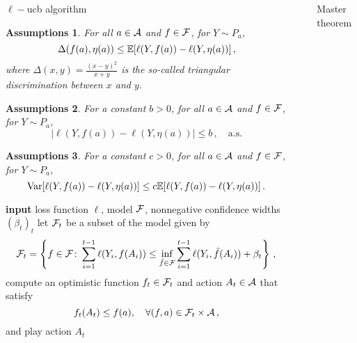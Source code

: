 \documentclass[final,notheorems,noamsthm,20pt]{beamer}
\newtheorem{assumption}{Assumptions}
\newlength{\sepwidth}
\newlength{\colwidth}
\newcommand{\separatorcolumn}{\begin{column}{\sepwidth}\end{column}}
\begin{document}
\begin{frame}[t]
\begin{columns}[t]
\begin{column}{\colwidth}
\begin{block}{$\ell-$ucb algorithm}
    \begin{assumption}\label{ass:triangle}
        For all $a \in\mathcal{A}$ and $f \in \mathcal{F}$, for $Y \sim P_a$,
        $$\Delta(f(a), \eta(a)) \leq \mathbb{E}[\ell(Y,f(a)) - \ell(Y,\eta(a))]\,,$$
        where $\Delta(x,y) = \frac{(x-y)^2}{x+y}$ is the so-called triangular discrimination between $x$ and $y$.
    \end{assumption}
    \begin{assumption}\label{ass:bounded}
        For a constant $b > 0$, for all $a \in \mathcal{A}$ and $f \in \mathcal{F}$, for $Y \sim P_a$,
        $$
        |\ell(Y, f(a)) - \ell(Y, \eta(a))| \leq b\,, \quad \text{a.s.}
        $$
    \end{assumption}
    \begin{assumption}\label{ass:self-bounding}
        For a constant $c > 0$, for all $a \in \mathcal{A}$ and $f \in \mathcal{F}$, for $Y \sim P_a$, 
        $$
          \operatorname{Var}[\ell(Y, f(a)) - \ell(Y, \eta(a))] \leq c \mathbb{E}[\ell(Y, f(a)) - \ell(Y, \eta(a))]\,.
        $$
    \end{assumption}

  \end{block}

  \begin{algorithm}[H]
        \caption{$\ell$-UCB bandit algorithm}\label{alg:bandit}
        \begin{algorithmic}
            \State \textbf{input} loss function $\ell$, model $\mathcal{F}$, nonnegative confidence widths $(\beta_t)_t$
              \State let $\mathcal{F}_t$ be a subset of the model given by
              $$\mathcal{F}_t = \left\{f \in \mathcal{F} \colon \sum_{i=1}^{t-1}
              \ell(Y_i, f(A_i)) \leq \inf_{\hat f \in \mathcal{F}} \sum_{i=1}^{t-1}
              \ell(Y_i, \hat f(A_i)) + \beta_t \right\}\,,$$
              \State compute an optimistic function $f_t \in \mathcal{F}_t$ and action $A_t \in \mathcal{A}$ that satisfy
              $$
                f_t(A_t) \leq f(a), \quad \forall (f, a) \in \mathcal{F}_t \times \mathcal{A}\,,
              $$
              \State and play action $A_t$
            \EndFor
        \end{algorithmic}
    \end{algorithm}

\end{column}

\separatorcolumn

\begin{column}{\colwidth}

  \begin{alertblock}{Master theorem}


\end{alertblock}
\end{column}
\end{columns}
\end{frame}
\end{document}
